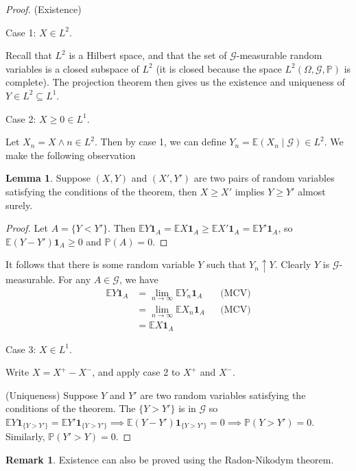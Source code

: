 \documentclass[parskip=full]{article}
\theoremstyle{definition}
\newtheorem{lemma}{Lemma}[theorem]
\newtheorem*{remark}{Remark}
\newcommand{\Pbb}{\mathbb{P}}
\newcommand{\1}{\mathbbm{1}}
\newcommand{\E}{\mathbb{E}}
\begin{document}
\begin{proof}(Existence)

Case 1: $X \in L^2$. 

Recall that $L^2$ is a Hilbert space, and that the set of $\mathcal{G}$-measurable random variables is a closed subspace of $L^2$ (it is closed because the space $L^2(\Omega, \mathcal{G}, \Pbb)$ is complete). The projection theorem then gives us the existence and uniqueness of $Y\in L^2 \subseteq L^1$.

Case 2: $X \geq 0 \in L^1$.

Let $X_n = X \wedge n \in L^2$. Then by case 1, we can define $Y_n = \E(X_n \mid \mathcal{G}) \in L^2$. We make the following observation

\begin{lemma}
Suppose $(X, Y)$ and $(X', Y')$ are two pairs of random variables satisfying the conditions of the theorem, then $X \geq X'$ implies $Y \geq Y'$ almost surely.
\end{lemma}

\begin{proof}
    Let $A = \{Y < Y'\}$. Then $\E Y \mathbf{1}_A = \E X \mathbf{1}_A \geq \E X' \mathbf{1}_A = \E Y' \mathbf{1}_A$, so $\E (Y - Y') \mathbf{1}_A \geq 0$ and $\Pbb(A) = 0$.
\end{proof}

It follows that there is some random variable $Y$ such that $Y_n \uparrow Y$. Clearly $Y$ is $\mathcal{G}$-measurable. For any $A \in \mathcal{G}$, we have
\begin{align*}
    \E Y \mathbf{1}_A &= \lim_{n \to \infty} \E Y_n \mathbf{1}_A &&\text{(MCV)}\\
    &= \lim_{n \to \infty} \E X_n \mathbf{1}_A &&\text{(MCV)}\\
    &= \E X \mathbf{1}_A
\end{align*}

Case 3: $X \in L^1$.

Write $X = X^+ - X^-$, and apply case 2 to $X^+$ and $X^-$.

(Uniqueness)
Suppose $Y$ and $Y'$ are two random variables satisfying the conditions of the theorem. The $\{Y > Y'\}$ is in $\mathcal{G}$ so $\E Y \mathbf{1}_{\{Y > Y'\}} = \E Y' \mathbf{1}_{\{Y > Y'\}} \implies \E (Y - Y') \mathbf{1}_{\{Y > Y'\}} = 0 \implies \Pbb(Y > Y') = 0$. Similarly, $\Pbb(Y' > Y) = 0$.
\end{proof}

\begin{remark}
Existence can also be proved using the Radon-Nikodym theorem.
\end{remark}
\end{document}
